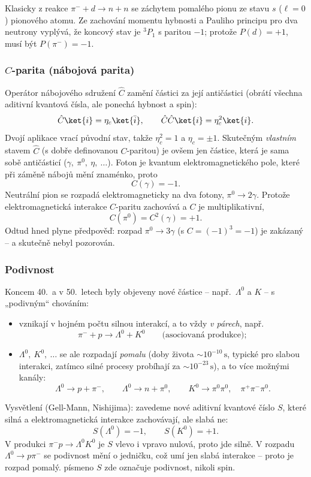 \begin{vysvetleni}
Klasicky z reakce \(\pi^- + d \to n + n\) se záchytem pomalého pionu ze stavu
\(s\) (\(\ell=0\)) pionového atomu. Ze zachování momentu hybnosti a
Pauliho principu pro dva neutrony vyplývá, že koncový stav je \(^3P_1\)
s paritou \(-1\); protože \(P(d)=+1\), musí být \(P(\pi^-)=-1\).
\end{vysvetleni}

\subsubsection*{\(C\)-parita (nábojová parita)}

Operátor nábojového sdružení \(\hat C\) zamění částici za její antičástici
(obrátí všechna aditivní kvantová čísla, ale ponechá hybnost a spin):
\[
  \hat C\ket{i}=\eta_c\ket{\bar i}, \qquad
  \hat C\hat C\ket{i}=\eta_c^2\ket{i} .
\]
Dvojí aplikace vrací původní stav, takže \(\eta_c^2=1\) a \(\eta_c=\pm1\).
Skutečným \emph{vlastním} stavem \(\hat C\) (s dobře definovanou
\(C\)-paritou) je ovšem jen částice, která je sama sobě antičásticí
(\(\gamma,\ \pi^0,\ \eta,\ \dots\)). Foton je kvantum elektromagnetického
pole, které při záměně nábojů mění znaménko, proto
\[
  C(\gamma)=-1 .
\]
Neutrální pion se rozpadá elektromagneticky na dva fotony, \(\pi^0\to2\gamma\).
Protože elektromagnetická interakce \(C\)-paritu zachovává a \(C\) je
multiplikativní,
\[
  C(\pi^0)=C^2(\gamma)=+1 .
\]
Odtud hned plyne předpověď: rozpad \(\pi^0\to3\gamma\) (s \(C=(-1)^3=-1\))
je zakázaný -- a skutečně nebyl pozorován.

\subsubsection*{Podivnost}

Koncem 40.\ a v 50.\ letech byly objeveny nové částice -- např.\
\(\Lambda^0\) a \(K\) -- s „podivným“ chováním:
\begin{itemize}
  \item vznikají v hojném počtu silnou interakcí, a to vždy \emph{v párech},
    např.
    \[ \pi^- + p \to \Lambda^0 + K^0 \qquad\text{(asociovaná produkce)}; \]
  \item \(\Lambda^0,\ K^0,\ \dots\) se ale rozpadají \emph{pomalu}
    (doby života \(\sim10^{-10}\,\mathrm{s}\), typické pro slabou interakci,
    zatímco silné procesy probíhají za \(\sim10^{-23}\,\mathrm{s}\)), a to
    více možnými kanály:
    \[
      \Lambda^0 \to p+\pi^-,\qquad \Lambda^0\to n+\pi^0, \qquad
      K^0\to\pi^0\pi^0,\quad \pi^+\pi^-\pi^0 .
    \]
\end{itemize}
Vysvětlení (Gell-Mann, Nishijima): zavedeme nové aditivní kvantové číslo
\kw{podivnost} \(S\), které silná a elektromagnetická interakce zachovávají,
ale slabá ne:
\[
  S(\Lambda^0)=-1,\qquad S(K^0)=+1 .
\]
V produkci \(\pi^-p\to\Lambda^0K^0\) je \(S\) vlevo i vpravo nulová, proto
jde silně. V rozpadu \(\Lambda^0\to p\pi^-\) se podivnost mění o jedničku,
což umí jen slabá interakce -- proto je rozpad pomalý.
 písmeno \(S\) zde označuje podivnost, nikoli spin.

